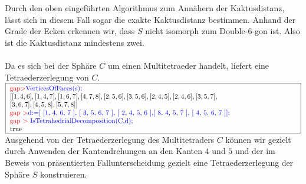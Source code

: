 \documentclass[12pt,titlepage,twoside,cleardoublepage]{article}
\theoremstyle{nummermitklammern}
\numberwithin{equation}{section}
\begin{document}
Durch den oben eingeführten Algorithmus zum Annähern der Kaktusdistanz, lässt sich in diesem Fall sogar die exakte Kaktusdistanz bestimmen. Anhand der Grade der Ecken erkennen wir, dass $S$ nicht isomorph zum Double-6-gon ist. Also ist die Kaktusdistanz mindestens zwei.\\
 \\
Da es sich bei der Sphäre $C$ um einen Multitetraeder handelt, liefert  eine Tetraederzerlegung von $C.$\\ 
 $\fbox{
\parbox{15cm}{
\textcolor{red}{gap$>$}\textcolor{blue}{ VerticesOfFaces(s);}\newline 
$[ [ 1, 4, 6 ], [ 1, 4, 7 ], [ 1, 6, 7 ], [ 4, 7, 8 ], [ 2, 5, 6 ],
[ 3, 5, 6 ],[ 2, 4, 5 ], [ 2, 4, 6 ], [ 3, 5, 7 ],$ \newline
$  [ 3, 6, 7 ],
[ 4, 5, 8 ], [ 5, 7, 8 ] ]$\newline
\textcolor{red}{gap $>$}\textcolor{blue}{d:=[ [1, 4, 6, 7 ], [ 3, 5, 6, 7 ], [ 2, 4, 5, 6 ],[ 8, 4, 5, 7 ], [ 4, 5, 6, 7 ]];}\newline
\textcolor{red}{gap $>$} \textcolor{blue}{IsTetrahedrialDecomposition(C,d);}\newline
true
 }}$\\
 Ausgehend von der Tetraederzerlegung des Multitetraders $C$ können wir gezielt durch Anwenden der Kantendrehungen an den Kanten $4$ und $5$ und der im Beweis von  präsentierten Fallunterscheidung gezielt eine Tetraederzerlegung der Sphäre $S$ konstruieren.\\
\end{document}
